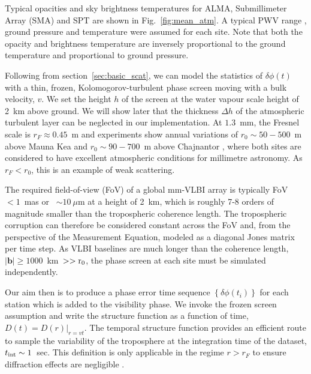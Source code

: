 Typical opacities and sky brightness temperatures for ALMA, Submillimeter Array (SMA) and SPT  are shown in Fig.~\ref{fig:mean_atm}. A typical PWV range \cite{Lane_1998}, ground pressure and temperature were assumed for each site. Note that both the opacity and brightness temperature are inversely proportional to the ground temperature and proportional to ground pressure.




Following from section~\ref{sec:basic_scat}, we can model the statistics of $\delta \phi(t)$ with a thin, frozen, Kolomogorov-turbulent phase screen moving with a bulk velocity, $v$.  We set the height $h$ of the screen at the water vapour scale height of 2~km above ground. We will show later that the thickness $\Delta h$ of the atmospheric turbulent layer can be neglected in our implementation. At $1.3$~mm, the Fresnel scale is $r_F \approx 0.45$~m and experiments show annual variations of $r_0 \sim 50 - 500$~m above Mauna Kea \citep{Masson_1994} and $r_0 \sim 90 - 700$~m above Chajnantor \citep*{Radford_1998}, where both sites are considered to have excellent atmospheric conditions for millimetre astronomy. As $r_F < r_0$, this is an example of weak scattering. 


The required field-of-view (FoV) of a global mm-VLBI array is typically FoV~$< 1$~mas or ~$\sim10~\mu$m at a height of 2~km, which is roughly 7-8 orders of magnitude smaller than the tropospheric coherence length. The tropospheric corruption can therefore be considered constant across the FoV and, from the perspective of the Measurement Equation, modeled as a diagonal Jones matrix per time step. As VLBI baselines are much longer than the coherence length, $|\mathbf{b}| \ge 1000$~km~$>> \rm r_0$, the phase screen at each site must be simulated independently.



Our aim then is to produce a phase error time sequence $\left\{\delta \phi(t_i)\right\}$ for each station which is added to the visibility phase. We invoke the frozen screen assumption and write the structure function as a function of time, $D (t) =  D(r)|_{r=vt}$. The temporal structure function provides an efficient route to sample the variability of the troposphere at the integration time of the dataset, $t_{\rm int} \sim 1$~sec. This definition is only applicable in the regime $r > r_F$ to ensure diffraction effects are negligible \cite{Thompson_2001}. 


